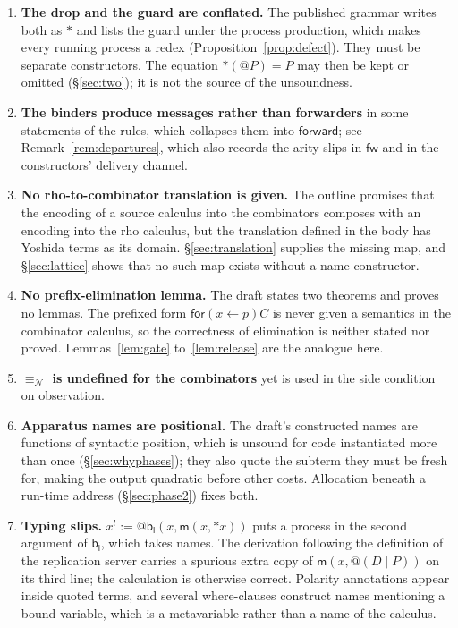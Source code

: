 \documentclass[11pt]{article}
\makeatletter
\theoremstyle{plain}
\theoremstyle{definition}
\theoremstyle{remark}
\newcommand{\quo}[1]{@#1}
\newcommand{\drp}[1]{{*}#1}
\newcommand{\nequiv}{\equiv_{\mathcal{N}}}
\newcommand{\mm}{\mathsf{m}}
\newcommand{\fw}{\mathsf{fw}}
\newcommand{\bl}{\mathsf{b}_{\mathsf{l}}}
\makeatother
\begin{document}
\begin{enumerate}[leftmargin=1.6em]
\item \textbf{The drop and the guard are conflated.} The published grammar
writes both as $\mathsf{*}$ and lists the guard under the process
production, which makes every running process a redex
(Proposition~\ref{prop:defect}). They must be separate constructors. The
equation $\mathsf{*}(\quo{P}) = P$ may then be kept or omitted
(\S\ref{sec:two}); it is not the source of the unsoundness.

\item \textbf{The binders produce messages rather than forwarders} in some
statements of the rules, which collapses them into $\mathsf{forward}$; see
Remark~\ref{rem:departures}, which also records the arity slips in $\fw$ and
in the constructors' delivery channel.

\item \textbf{No rho-to-combinator translation is given.} The outline
promises that the encoding of a source calculus into the combinators
composes with an encoding into the rho calculus, but the translation defined
in the body has Yoshida terms as its domain. \S\ref{sec:translation} supplies
the missing map, and \S\ref{sec:lattice} shows that no such map exists
without a name constructor.

\item \textbf{No prefix-elimination lemma.} The draft states two theorems and
proves no lemmas. The prefixed form $\mathsf{for}(x \leftarrow p)C$ is never
given a semantics in the combinator calculus, so the correctness of
elimination is neither stated nor proved. Lemmas~\ref{lem:gate}
to~\ref{lem:release} are the analogue here.

\item \textbf{$\nequiv$ is undefined for the combinators} yet is used in the
side condition on observation.

\item \textbf{Apparatus names are positional.} The draft's constructed names
are functions of syntactic position, which is unsound for code instantiated
more than once (\S\ref{sec:whyphases}); they also quote the subterm they must
be fresh for, making the output quadratic before other costs. Allocation
beneath a run-time address (\S\ref{sec:phase2}) fixes both.

\item \textbf{Typing slips.} $x^{l} := \quo{\bl(x,\mm(x,\drp{x}))}$ puts a
process in the second argument of $\bl$, which takes names. The derivation
following the definition of the replication server carries a spurious extra
copy of $\mm(x,\quo{(D \mid P)})$ on its third line; the calculation is
otherwise correct. Polarity annotations appear inside quoted terms, and
several where-clauses construct names mentioning a bound variable, which is a
metavariable rather than a name of the calculus.
\end{enumerate}
\end{document}
